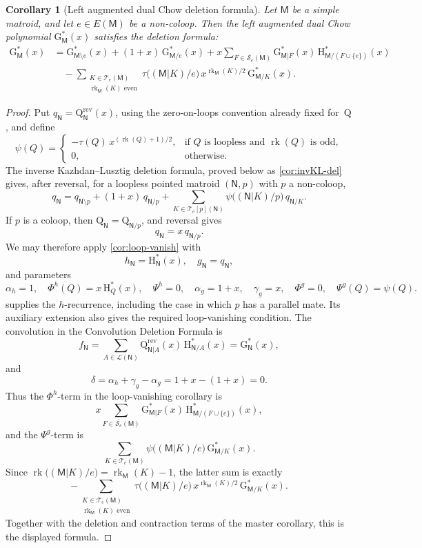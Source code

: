 \documentclass[12pt,letterpaper,english]{amsart}
\theoremstyle{teoremas}
\newtheorem{corollary}[theorem]{Corollary}
\theoremstyle{definition}
\DeclareMathOperator{\rk}{rk}
\newcommand{\M}{\mathsf{M}}
\newcommand{\N}{\mathsf{N}}
\newcommand{\Hstar}{\mathrm{H}^{*}}
\newcommand{\Gstar}{\mathrm{G}^{*}}
\newcommand{\QQ}{\mathrm{Q}}
\newcommand{\rev}{\mathrm{rev}}
\newcommand{\Se}{\mathcal{S}_e}
\newcommand{\Te}{\mathcal{T}_e}
\begin{document}
\begin{corollary}[Left augmented dual Chow deletion formula]
\label{cor:Gstar-del}
Let $\M$ be a simple matroid, and let $e \in E(\M)$ be a non-coloop.
Then the left augmented dual Chow polynomial $\Gstar_{\M}(x)$ satisfies
the deletion formula:
\begin{align*}
\Gstar_{\M}(x) &= \Gstar_{\M \setminus e}(x)
  + (1+x)\, \Gstar_{\M/e}(x)
  + x \sum_{F \in \overline{\Se}(\M)}
    \Gstar_{\M|F}(x)\, \Hstar_{\M/(F \cup \{e\})}(x) \\
&\quad - \sum_{\substack{K \in \Te(\M) \\ \rk_{\M}(K) \text{ even}}}
    \tau\bigl((\M|K)/e\bigr)\, x^{\rk_{\M}(K)/2}\,
    \Gstar_{\M/K}(x).
\end{align*}
\end{corollary}

\begin{proof}
Put $q_{\N} = \QQ^{\rev}_{\N}(x)$, using the zero-on-loops convention
already fixed for~$\QQ$, and define
\[
\psi(Q) =
\begin{cases}
-\tau(Q)\, x^{(\rk(Q)+1)/2}, & \text{if $Q$ is loopless and $\rk(Q)$ is odd},\\
0, & \text{otherwise}.
\end{cases}
\]
The inverse Kazhdan--Lusztig deletion formula, proved below as
\cref{cor:invKL-del} gives, after reversal, for a loopless pointed
matroid $(\N, p)$ with $p$ a non-coloop,
\[
q_{\N} = q_{\N \setminus p} + (1+x)\, q_{\N/p}
  + \sum_{K \in \Te[p](\N)}
    \psi\bigl((\N|K)/p\bigr)\, q_{\N/K}.
\]
If $p$ is a coloop, then $\QQ_{\N} = \QQ_{\N/p}$, and reversal gives
\[
q_{\N} = x\, q_{\N/p}.
\]
We may therefore apply \cref{cor:loop-vanish} with
\[
h_{\N} = \Hstar_{\N}(x),\quad g_{\N} = q_{\N},
\]
and parameters
\[
\alpha_h = 1,\quad
\Phi^h(Q) = x\, \Hstar_Q(x),\quad
\Psi^h = 0,\quad
\alpha_g = 1+x,\quad
\gamma_g = x,\quad
\Phi^g = 0,\quad
\Psi^g(Q) = \psi(Q).
\]
 supplies the $h$-recurrence, including the case
in which $p$ has a parallel mate.  Its auxiliary extension also gives the
required loop-vanishing condition.
The convolution in the Convolution Deletion Formula is
\[
f_{\N} = \sum_{A \in \mathcal{L}(\N)}
  \QQ^{\rev}_{\N|A}(x)\, \Hstar_{\N/A}(x) = \Gstar_{\N}(x),
\]
and
\[
\delta = \alpha_h + \gamma_g - \alpha_g = 1 + x - (1+x) = 0.
\]
Thus the $\Phi^h$-term in the loop-vanishing corollary is
\[
x \sum_{F \in \overline{\Se}(\M)}
  \Gstar_{\M|F}(x)\, \Hstar_{\M/(F \cup \{e\})}(x),
\]
and the $\Psi^g$-term is
\[
\sum_{K \in \Te(\M)}
  \psi\bigl((\M|K)/e\bigr)\, \Gstar_{\M/K}(x).
\]
Since $\rk\bigl((\M|K)/e\bigr) = \rk_{\M}(K) - 1$, the latter sum is
exactly
\[
-\sum_{\substack{K \in \Te(\M) \\ \rk_{\M}(K) \text{ even}}}
  \tau\bigl((\M|K)/e\bigr)\, x^{\rk_{\M}(K)/2}\,
  \Gstar_{\M/K}(x).
\]
Together with the deletion and contraction terms of the master corollary,
this is the displayed formula.
\end{proof}
\end{document}
